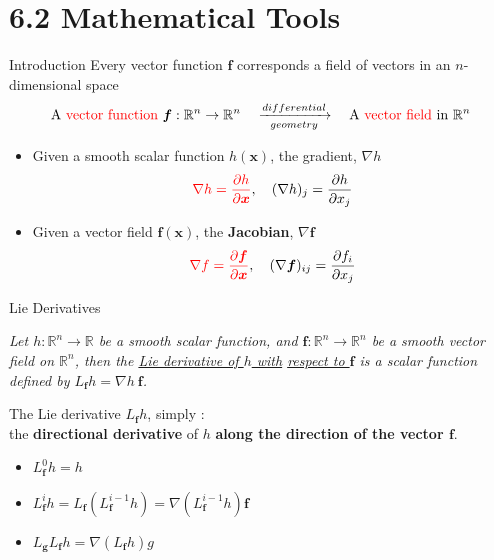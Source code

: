 \documentclass{beamer}
\renewcommand{\vec}[1]{\ensuremath{\boldsymbol{#1}}} %
\begin{document}
\section{6.2  Mathematical Tools}


\begin{frame}{Introduction}
Every vector function \vec{f} corresponds a field of vectors in an $n$-dimensional space
$$
\text{A {\color{red}vector function}}~\vec{f}:\mathbb{R}^{n}\rightarrow \mathbb{R}^{n} \quad \xrightarrow[geometry]{differential} \quad \text{A {\color{red}vector field} in}~ \mathbb{R}^{n}
$$

\begin{itemize}
  \item Given a smooth scalar function $h(\vec{x})$, the gradient, $\nabla h$
      $$
      {\color{red}\nabla h = \frac{\partial h}{\partial \vec{x}}}, \quad (\nabla h)_{j} = \frac{\partial h}{\partial x_{j}}
      $$
  \item Given a vector field $\vec{f}(\vec{x})$, the \textbf{Jacobian}, $\nabla \vec{f}$
      $$
      {\color{red}\nabla f = \frac{\partial \vec{f}}{\partial \vec{x}}}, \quad (\nabla \vec{f})_{ij} = \frac{\partial f_{i}}{\partial x_{j}}
      $$
\end{itemize}
\end{frame}


\begin{frame}{Lie Derivatives}
    \begin{definition}[6.1]
    \textit{
        Let $h : \mathbb{R}^{n} \rightarrow \mathbb{R}$ be a smooth scalar function, and $\vec{f} : \mathbb{R}^{n} \rightarrow \mathbb{R}^{n}$ be a smooth vector field on $\mathbb{R}^{n}$, then the \underline{Lie derivative of $h$ with}
        \underline{respect to \vec{f}} is a scalar function defined by {\color{red} $L_{\vec{f}}h = \nabla h ~\vec{f}$}.
        }
    \end{definition}

    The Lie derivative $L_{\vec{f}}h$, simply : \\
    the \textbf{directional derivative} of $h$ \textbf{along the direction of the vector \vec{f}}.
    \begin{itemize}
      \item $L_{\vec{f}}^{0}h = h$
      \item $L_{\vec{f}}^{i}h = L_{\vec{f}}(L_{\vec{f}}^{i-1}h) = \nabla(L_{\vec{f}}^{i-1}h )\vec{f}$
      \item $L_{\vec{g}}L_{\vec{f}}h = \nabla(L_{\vec{f}}h)g $
    \end{itemize}
\end{frame}
\end{document}
